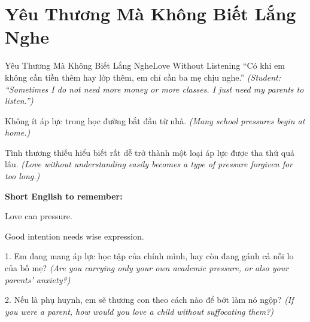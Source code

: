 \section{Yêu Thương Mà Không Biết Lắng Nghe}
\begin{truyen}{Yêu Thương Mà Không Biết Lắng Nghe}{Love Without Listening}
 ``Có khi em không cần tiền thêm hay lớp thêm, em chỉ cần ba mẹ chịu nghe.''
\textit{(Student: ``Sometimes I do not need more money or more classes. I just need my parents to listen.'')}

\end{truyen}

\begin{baihoc}
Không ít áp lực trong học đường bắt đầu từ nhà.
\textit{(Many school pressures begin at home.)}

Tình thương thiếu hiểu biết rất dễ trở thành một loại áp lực được tha thứ quá lâu.
\textit{(Love without understanding easily becomes a type of pressure forgiven for too long.)}
\end{baihoc}

\begin{ghinhoanh}
\textbf{Short English to remember:}

Love can pressure.

Good intention needs wise expression.
\end{ghinhoanh}

\begin{tuhocnhanh}
1. Em đang mang áp lực học tập của chính mình, hay còn đang gánh cả nỗi lo của bố mẹ? \textit{(Are you carrying only your own academic pressure, or also your parents' anxiety?)}

2. Nếu là phụ huynh, em sẽ thương con theo cách nào để bớt làm nó ngộp? \textit{(If you were a parent, how would you love a child without suffocating them?)}
\end{tuhocnhanh}

\ngancach
